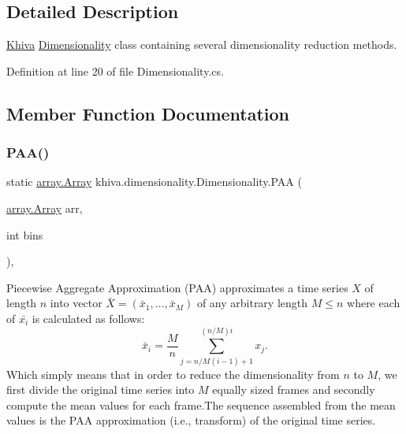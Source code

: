 \subsection{Detailed Description}
\mbox{\hyperlink{classkhiva_1_1_khiva}{Khiva}} \mbox{\hyperlink{classkhiva_1_1dimensionality_1_1_dimensionality}{Dimensionality}} class containing several dimensionality reduction methods. 



Definition at line 20 of file Dimensionality.\+cs.



\subsection{Member Function Documentation}
\mbox{\label{classkhiva_1_1dimensionality_1_1_dimensionality_a94804fb9064e5cb1eb2b34a8c8a3fadd}} 
\subsubsection{\texorpdfstring{P\+A\+A()}{PAA()}}
{\footnotesize\ttfamily static \mbox{\hyperlink{classkhiva_1_1array_1_1_array}{array.\+Array}} khiva.\+dimensionality.\+Dimensionality.\+P\+AA (\begin{DoxyParamCaption}\item[{\mbox{\hyperlink{classkhiva_1_1array_1_1_array}{array.\+Array}}}]{arr,  }\item[{int}]{bins }\end{DoxyParamCaption})\hspace{0.3cm}{\ttfamily [inline]}, {\ttfamily [static]}}



Piecewise Aggregate Approximation (P\+AA) approximates a time series $X$ of length $n$ into vector $\bar{X}=(\bar{x}_{1},…,\bar{x}_{M})$ of any arbitrary length $M \leq n$ where each of $\bar{x_{i}}$ is calculated as follows\+: \[ \bar{x}_{i} = \frac{M}{n} \sum_{j=n/M(i-1)+1}^{(n/M)i} x_{j}. \] Which simply means that in order to reduce the dimensionality from $n$ to $M$, we first divide the original time series into $M$ equally sized frames and secondly compute the mean values for each frame.\+The sequence assembled from the mean values is the P\+AA approximation (i.\+e., transform) of the original time series. 


